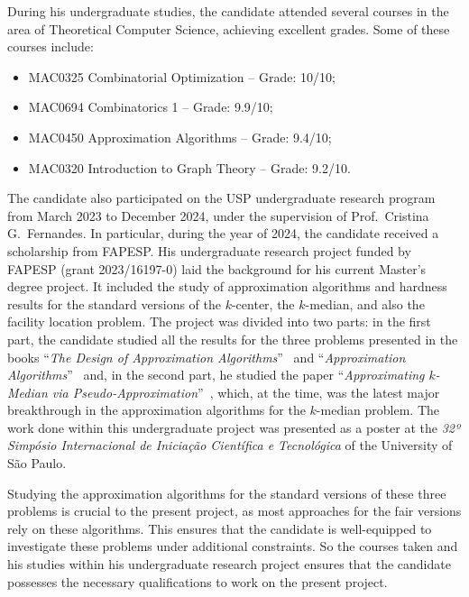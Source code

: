 \documentclass[12pt]{article}
\begin{document}
During his undergraduate studies, the candidate attended several courses in the area of Theoretical Computer Science, achieving excellent grades. Some of these courses include:
\begin{itemize} 
    \item MAC0325 Combinatorial Optimization – Grade: 10/10; 
    \item MAC0694 Combinatorics 1 – Grade: 9.9/10; 
    \item MAC0450 Approximation Algorithms – Grade: 9.4/10; 
    \item MAC0320 Introduction to Graph Theory – Grade: 9.2/10. 
\end{itemize}

The candidate also participated on the USP undergraduate research program from March 2023 to December 2024, under the supervision of Prof.\ Cristina G.\ Fernandes.  In particular, during the year of 2024, the candidate received a scholarship from FAPESP.
His undergraduate research project funded by FAPESP (grant 2023/16197-0) laid the background for his current Master's degree project. 
It included the study of approximation algorithms and hardness results for the standard versions of the $k$-center, 
the $k$-median, and also the facility location problem. 
The project was divided into two parts: in the first part, the candidate studied all the results for the three problems 
presented in the books  ``\emph{The Design of Approximation Algorithms}''~\cite{books/WS} and 
``\emph{Approximation Algorithms}''~\cite{books/Vazirani} and, in the second part, he studied the paper 
``\emph{Approximating $k$-Median via Pseudo-Approximation}''~\cite{LS2012}, which, at the time, 
was the latest major breakthrough in the approximation algorithms for the $k$-median problem. 
The work done within this undergraduate project was presented as a poster at the \emph{32º Simpósio Internacional de Iniciação Científica e Tecnológica} of the University of São Paulo.

Studying the approximation algorithms for the standard versions of these three problems is crucial to the present project, as most approaches for the fair versions rely on these algorithms. This ensures that the candidate is well-equipped to investigate these problems under additional constraints. So the courses taken and his studies within his undergraduate research project ensures that the candidate possesses the necessary qualifications to work on the present project.  
\end{document}

